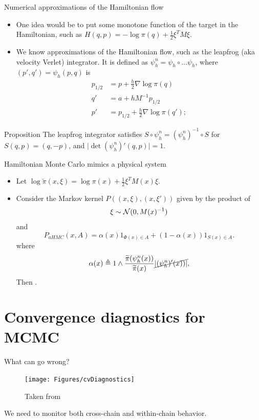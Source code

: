 \documentclass[10pt]{beamer}
\let\oldcitep=\citep
\renewcommand\citep[1]{\hyperlink{#1}{\textcolor{vert}{\oldcitep{#1}}}}
\def\tpi{\widetilde{\pi}}
\begin{document}
\begin{frame}{Numerical approximations of the Hamiltonian flow}
\begin{itemize}
  \item One idea would be to put some monotone function of the target in the Hamiltonian, such as $ H(q,p) = -\log \pi(q) + \frac12 \xi^T M \xi $.
  \item We know approximations of the Hamiltonian flow, such as the leapfrog (aka velocity Verlet) integrator. It is defined as $\psi_h^n = \psi_h \circ \dots \psi_h$, where $(p',q') = \psi_h(p,q)$ is 
\begin{align*}
    p_{1/2} &= p + \frac{h}{2}\nabla \log \pi(q)\\
    q' &= a+hM^{-1}p_{1/2}\\
    p' &= p_{1/2} + \frac{h}{2} \nabla \log\pi (q');
\end{align*}
\end{itemize}
\begin{block}{Proposition}
  The leapfrog integrator satisfies $S\circ \psi_h^n = (\psi_h^n)^{-1}\circ S$ for $S(q,p) = (q,-p)$, and $\vert \det (\psi_h^n)'(q,p)\vert = 1$. 
\end{block}
\end{frame}

\begin{frame}{Hamiltonian Monte Carlo mimics a physical system}
  \begin{itemize}
    \item Let $\log \tpi(x, \xi) =  \log \pi(x) + \frac12 \xi^T M(x) \xi$.
    \item Consider the Markov kernel $P((x,\xi), (x,\xi'))$ given by the product of
    $$ \xi\sim \mathcal{N}(0,M(x)^{-1})$$
    and
    $$
    P_{aHMC}(x,A) = \alpha(x) 1_{\Phi(x)\in A} + (1-\alpha(x))1_{S(x)\in A}.
    $$
    where 
    \begin{equation}
      \alpha(x) \triangleq 1\wedge \frac{\tpi(\psi_h^n(x))}{\tpi(x)} \cancel{\vert (\psi_h^n)'(x))\vert},
    \end{equation}
    Then .
\end{itemize}
\blank
\end{frame}



\section{Convergence diagnostics for MCMC}
\begin{frame}{What can go wrong?}
\begin{figure}
\texttt{[image: Figures/cvDiagnostics]}
\caption{Taken from \citep{GCSDVR13}}
\end{figure}
We need to monitor both cross-chain and within-chain behavior.
\end{frame}
\end{document}
